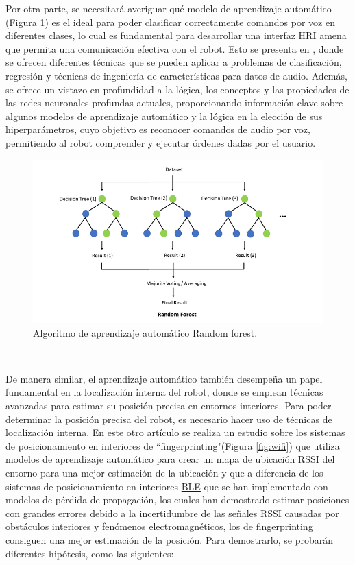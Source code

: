 Por otra parte, se necesitará averiguar qué modelo de aprendizaje automático (Figura \ref{fig:random_forest}) es el ideal para poder clasificar correctamente comandos por voz en diferentes clases, lo cual es fundamental para desarrollar una interfaz HRI amena que permita una comunicación efectiva con el robot. Esto se presenta en \cite{Zenkov-sklearn-SER-basics}, donde se ofrecen diferentes técnicas que se pueden aplicar a problemas de clasificación, regresión y técnicas de ingeniería de características para datos de audio. Además, se ofrece un vistazo en profundidad a la lógica, los conceptos y las propiedades de las redes neuronales profundas actuales, proporcionando información clave sobre algunos modelos de aprendizaje automático y la lógica en la elección de sus hiperparámetros, cuyo objetivo es reconocer comandos de audio por voz, permitiendo al robot comprender y ejecutar órdenes dadas por el usuario.\\

\begin{figure} [H]
  \begin{center}
    \includegraphics[scale=0.8]{figs/random_forest}
  \end{center}
  \caption{Algoritmo de aprendizaje automático Random forest.}
  \label{fig:random_forest}
\end{figure}\

De manera similar, el aprendizaje automático también desempeña un papel fundamental en la localización interna del robot, donde se emplean técnicas avanzadas para estimar su posición precisa en entornos interiores. Para poder determinar la posición precisa del robot, es necesario hacer uso de técnicas de localización interna. En este otro artículo \cite{unknown} se realiza un estudio sobre los sistemas de posicionamiento en interiores de ``fingerprinting"(Figura \ref{fig:wifi}) que utiliza modelos de aprendizaje automático para crear un mapa de ubicación RSSI del entorno para una mejor estimación de la ubicación y que a diferencia de los sistemas de posicionamiento en interiores \hyperlink{BLE}{BLE} que se han implementado con modelos de pérdida de propagación, los cuales han demostrado estimar posiciones con grandes errores debido a la incertidumbre de las señales RSSI causadas por obstáculos interiores y fenómenos electromagnéticos, los de fingerprinting consiguen una mejor estimación de la posición. Para demostrarlo, se probarán diferentes hipótesis, como las siguientes:

